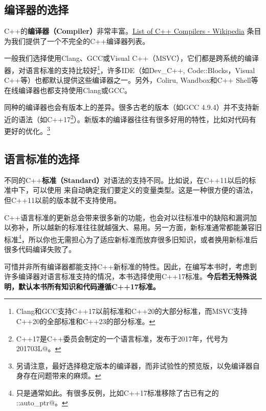 \subsection*{编译器的选择}
C++的\textbf{编译器（Compiler）}非常丰富。\href{https://en.wikipedia.org/wiki/List_of_compilers\#C++_compilers}{List of C++ Compilers - Wikipedia} 条目为我们提供了一个不完全的C++编译器列表。\par
一般我们选择使用Clang、GCC或Visual C++（MSVC），它们都是跨系统的编译器，对语言标准的支持比较好\footnote{Clang和GCC支持C++17以前标准和C++20的大部分标准，而MSVC支持C++20的全部标准和C++23的部分标准。}，许多IDE（如Dev\_C++, Code::Blocks，Visual C++等）也都默认提供这些编译器之一。另外，Coliru, Wandbox和C++ Shell等在线编译器也都支持使用Clang或GCC。\par
同种的编译器也会有版本上的差异。很多古老的版本（如GCC 4.9.4）并不支持新近的语法（如C++17\footnote{C++17是C++委员会制定的一个语言标准，发布于2017年，代号为 \lstinline@201703L@。}）。新版本的编译器往往有很多好用的特性，比如对代码有更好的优化。\footnote{另请注意，最好选择稳定版本的编译器，而非试验性的预览版，以免编译器自身存在问题带来的麻烦。}\par
\subsection*{语言标准的选择}
不同的C++\textbf{标准（Standard）}对语法的支持不同。比如说，在C++11以后的标准中下，可以使用 \lstinline@auto@ 来自动确定我们要定义的变量类型。这是一种很方便的语法，但C++11以前的版本就不支持使用。\par
C++语言标准的更新总会带来很多新的功能，也会对以往标准中的缺陷和漏洞加以弥补，所以越新的标准往往就越强大、易用。另一方面，新标准通常都能兼容旧标准\footnote{只是通常如此。有很多反例，比如C++17标准移除了古已有之的 \lstinline@std::auto_ptr@。}，所以你也无需担心为了适应新标准而放弃很多旧知识，或者换用新标准后很多代码编译失败了。\par
可惜并非所有编译器都能支持C++新标准的特性。因此，在编写本书时，考虑到许多编译器对语言标准支持的情况，本书选择使用C++17标准。\textbf{今后若无特殊说明，默认本书所有知识和代码遵循C++17标准。}\par
